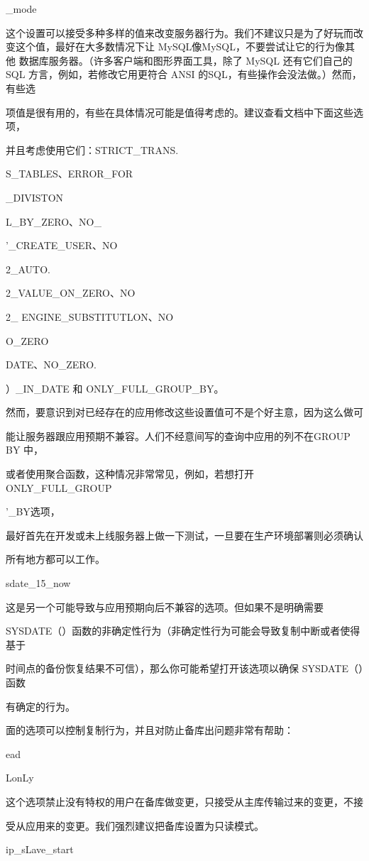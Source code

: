 \_mode

这个设置可以接受多种多样的值来改变服务器行为。我们不建议只是为了好玩而改
变这个值，最好在大多数情况下让 MySQL像MySQL，不要尝试让它的行为像其他
数据库服务器。（许多客户端和图形界面工具，除了 MySQL 还有它们自己的 SQL
方言，例如，若修改它用更符合 ANSI 的SQL，有些操作会没法做。）然而，有些选

项值是很有用的，有些在具体情况可能是值得考虑的。建议查看文档中下面这些选项，

并且考虑使用它们：STRICT\_TRANS.

S\_TABLES、ERROR\_FOR

\_DIVISTON

L\_BY\_ZERO、NO\_

'\_CREATE\_USER、NO

2\_AUTO.

2\_VALUE\_ON\_ZERO、NO

2\_ ENGINE\_SUBSTITUTLON、NO

O\_ZERO

DATE、NO\_ZERO.

）\_IN\_DATE 和 ONLY\_FULL\_GROUP\_BY。

然而，要意识到对已经存在的应用修改这些设置值可不是个好主意，因为这么做可

能让服务器跟应用预期不兼容。人们不经意间写的查询中应用的列不在GROUP BY 中，

或者使用聚合函数，这种情况非常常见，例如，若想打开 ONLY\_FULL\_GROUP

'\_BY选项，

最好首先在开发或未上线服务器上做一下测试，一旦要在生产环境部署则必须确认

所有地方都可以工作。

sdate\_15\_now

这是另一个可能导致与应用预期向后不兼容的选项。但如果不是明确需要

SYSDATE（）函数的非确定性行为（非确定性行为可能会导致复制中断或者使得基于

时间点的备份恢复结果不可信），那么你可能希望打开该选项以确保 SYSDATE（）函数

有确定的行为。

面的选项可以控制复制行为，并且对防止备库出问题非常有帮助：

ead

LonLy

这个选项禁止没有特权的用户在备库做变更，只接受从主库传输过来的变更，不接

受从应用来的变更。我们强烈建议把备库设置为只读模式。

ip\_sLave\_start

